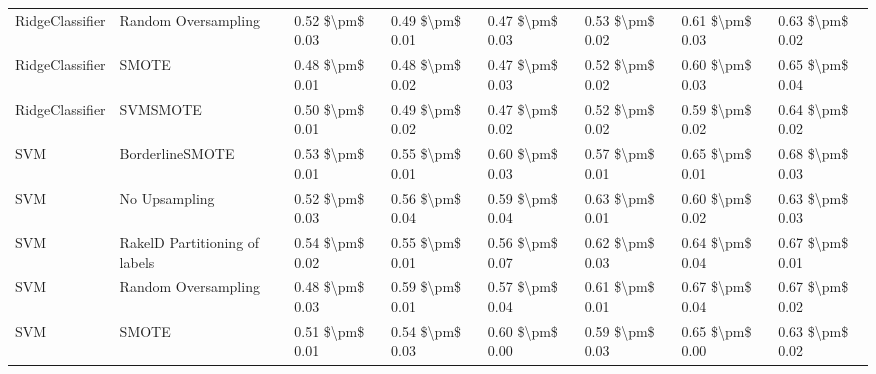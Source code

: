 \begin{tabular}{llllllll}
                RidgeClassifier &           Random Oversampling &     0.52 \$\textbackslash pm\$ 0.03 &           0.49 \$\textbackslash pm\$ 0.01 &       0.47 \$\textbackslash pm\$ 0.03 &        0.53 \$\textbackslash pm\$ 0.02 &                         0.61 \$\textbackslash pm\$ 0.03 & 0.63 \$\textbackslash pm\$ 0.02 \\
                RidgeClassifier &                         SMOTE &     0.48 \$\textbackslash pm\$ 0.01 &           0.48 \$\textbackslash pm\$ 0.02 &       0.47 \$\textbackslash pm\$ 0.03 &        0.52 \$\textbackslash pm\$ 0.02 &                         0.60 \$\textbackslash pm\$ 0.03 & 0.65 \$\textbackslash pm\$ 0.04 \\
                RidgeClassifier &                      SVMSMOTE &     0.50 \$\textbackslash pm\$ 0.01 &           0.49 \$\textbackslash pm\$ 0.02 &       0.47 \$\textbackslash pm\$ 0.02 &        0.52 \$\textbackslash pm\$ 0.02 &                         0.59 \$\textbackslash pm\$ 0.02 & 0.64 \$\textbackslash pm\$ 0.02 \\
                            SVM &               BorderlineSMOTE &     0.53 \$\textbackslash pm\$ 0.01 &           0.55 \$\textbackslash pm\$ 0.01 &       0.60 \$\textbackslash pm\$ 0.03 &        0.57 \$\textbackslash pm\$ 0.01 &                         0.65 \$\textbackslash pm\$ 0.01 & 0.68 \$\textbackslash pm\$ 0.03 \\
                            SVM &                 No Upsampling &     0.52 \$\textbackslash pm\$ 0.03 &           0.56 \$\textbackslash pm\$ 0.04 &       0.59 \$\textbackslash pm\$ 0.04 &        0.63 \$\textbackslash pm\$ 0.01 &                         0.60 \$\textbackslash pm\$ 0.02 & 0.63 \$\textbackslash pm\$ 0.03 \\
                            SVM & RakelD Partitioning of labels &     0.54 \$\textbackslash pm\$ 0.02 &           0.55 \$\textbackslash pm\$ 0.01 &       0.56 \$\textbackslash pm\$ 0.07 &        0.62 \$\textbackslash pm\$ 0.03 &                         0.64 \$\textbackslash pm\$ 0.04 & 0.67 \$\textbackslash pm\$ 0.01 \\
                            SVM &           Random Oversampling &     0.48 \$\textbackslash pm\$ 0.03 &           0.59 \$\textbackslash pm\$ 0.01 &       0.57 \$\textbackslash pm\$ 0.04 &        0.61 \$\textbackslash pm\$ 0.01 &                         0.67 \$\textbackslash pm\$ 0.04 & 0.67 \$\textbackslash pm\$ 0.02 \\
                            SVM &                         SMOTE &     0.51 \$\textbackslash pm\$ 0.01 &           0.54 \$\textbackslash pm\$ 0.03 &       0.60 \$\textbackslash pm\$ 0.00 &        0.59 \$\textbackslash pm\$ 0.03 &                         0.65 \$\textbackslash pm\$ 0.00 & 0.63 \$\textbackslash pm\$ 0.02 \\

\end{tabular}

